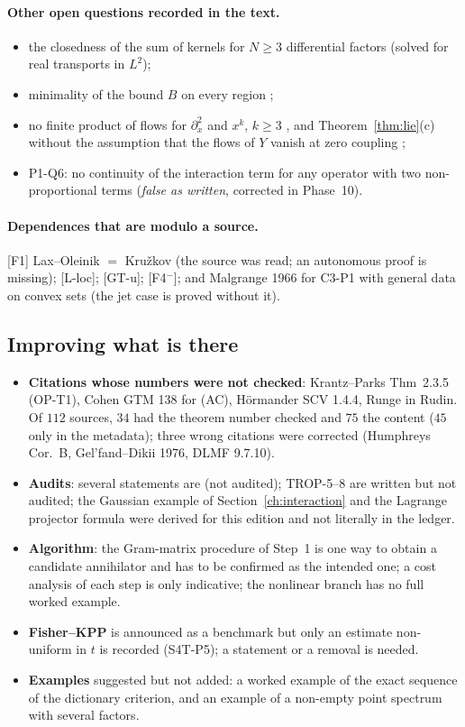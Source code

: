 \paragraph{Other open questions recorded in the text.}
\begin{itemize}
\item the closedness of the sum of kernels for $N\ge3$ differential factors \openq{}  (solved for real transports in $L^2$);
\item minimality of the bound $B$ on every region \openq{} ;
\item no finite product of flows for $\partial_x^2$ and $x^k$, $k\ge3$ \openq{} , and Theorem~\ref{thm:lie}(c) without the assumption that the flows of $Y$ vanish at zero coupling \openq{} ;
\item P1-Q6: no continuity of the interaction term for any operator with two non-proportional terms \openq{} (\emph{false as written}, corrected in Phase~10).
\end{itemize}

\paragraph{Dependences that are modulo a source.} [F1] Lax--Oleinik $=$ Kru\v zkov (the source was read; an autonomous proof is missing); [L-loc]; [GT-u]; [F4$^-$]; and Malgrange 1966 for C3-P1 with general data on convex sets (the jet case is proved without it).

\subsection{Improving what is there}

\begin{itemize}
\item \textbf{Citations whose numbers were not checked}: Krantz--Parks Thm~2.3.5 (OP-T1), Cohen GTM 138 for (AC), H\"ormander SCV 1.4.4, Runge in Rudin. Of $112$ sources, $34$ had the theorem number checked and $75$ the content ($45$ only in the metadata); three wrong citations were corrected (Humphreys Cor.~B, Gel'fand--Dikii 1976, DLMF 9.7.10).
\item \textbf{Audits}: several statements are \pw{} (not audited); TROP-5--8 are written but not audited; the Gaussian example of Section~\ref{ch:interaction} and the Lagrange projector formula were derived for this edition and not literally in the ledger.
\item \textbf{Algorithm}: the Gram-matrix procedure of Step~1 is one way to obtain a candidate annihilator and has to be confirmed as the intended one; a cost analysis of each step is only indicative; the nonlinear branch has no full worked example.
\item \textbf{Fisher--KPP} is announced as a benchmark but only an estimate non-uniform in $t$ is recorded (S4T-P5); a statement or a removal is needed.
\item \textbf{Examples} suggested but not added: a worked example of the exact sequence of the dictionary criterion, and an example of a non-empty point spectrum with several factors.
\end{itemize}

